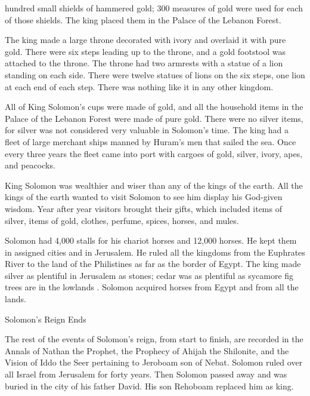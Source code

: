 {hundred
small shields
of hammered
gold;
300
measures of gold
were used
for each
of those shields.
The king
placed
them in the Palace
of the Lebanon
Forest.
\par }{\PP {}The king
made
a large
throne
decorated with ivory
and overlaid
it with pure
gold.
There were six
steps
leading up to the throne,
and a gold
footstool
was attached
to the throne.
The throne had two
armrests with a statue of a lion
standing
on each side.
There
were twelve
statues
of lions
on
the six
steps,
one lion at each end of each step. There was nothing
like
it in any
other kingdom.
\par }{\PP {}All
of King
Solomon’s
cups
were made of gold,
and all
the household items
in the Palace
of the Lebanon
Forest
were made of pure
gold.
There were no
silver
items, for silver was not
considered
very valuable
in Solomon’s
time.
The king
had a fleet of large merchant ships
manned by
Huram’s
men
that
sailed
the sea. Once
every three
years
the fleet
came
into port
with cargoes
of gold,
silver,
ivory,
apes,
and peacocks.
\par }{\PP {}King
Solomon
was wealthier
and wiser
than any
of the kings
of the earth.
All
the kings
of the earth
wanted
to visit Solomon
to see him
display
his God-given
wisdom.
Year
after
year
visitors
brought
their gifts,
which included items
of silver,
items
of gold,
clothes,
perfume,
spices,
horses,
and mules.
\par }{\PP {}Solomon
had 4,000
stalls
for his chariot
horses
and 12,000
horses.
He kept
them in assigned cities
and in
Jerusalem.
He ruled
all
the kingdoms
from
the Euphrates
River to
the land
of the Philistines
as far
as the border
of Egypt.
The king
made
silver
as plentiful in Jerusalem
as stones;
cedar
was
as plentiful
as sycamore fig trees
are in the lowlands .
Solomon
acquired
horses
from Egypt
and from all
the lands.
\par }{\SH Solomon’s Reign Ends
\par }{\PP {}The rest
of the events
of Solomon’s
reign, from start
to finish,
are
recorded
in
the Annals
of Nathan
the Prophet,
the Prophecy
of Ahijah
the Shilonite,
and the Vision
of Iddo
the Seer
pertaining
to Jeroboam
son
of Nebat.
Solomon
ruled
over
all
Israel
from Jerusalem
for forty
years.
Then Solomon
passed away
and was buried
in the city
of his father
David.
His son
Rehoboam
replaced
him as king.

}
